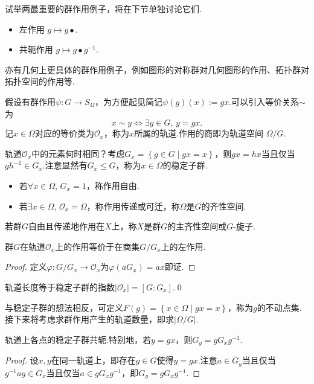 试举两最重要的群作用例子，将在下节单独讨论它们.
\begin{itemize}
	\item {\heiti 左作用} $g\mapsto g\bullet$.
	\item {\heiti 共轭作用} $g\mapsto g\bullet g^{-1}$.
\end{itemize}

亦有几何上更具体的群作用例子，例如图形的对称群对几何图形的作用、拓扑群对拓扑空间的作用等.

假设有群作用$\psi\colon G\to S_\Omega$，为方便起见简记$\psi(g)(x):=gx$.可以引入等价关系$\sim$为
\[
	x\sim y\iff\exists g\in G,\,y=gx.
\]
记$x\in\Omega$对应的等价类为$\mathcal{O}_x$，称为$x$所属的{\heiti 轨道}.作用的{\heiti 商}即为{\heiti 轨道空间} $\Omega/G$.

轨道$\mathcal{O}_x$中的元素何时相同？考虑$G_x=\left\{g\in G\mid gx=x\right\}$，则$gx=hx$当且仅当$gh^{-1}\in G_x$.注意显然有$G_x\le G$，称为$x\in\Omega$的{\heiti 稳定子群}.

\begin{itemize}
	\item 若$\forall x\in\Omega,\,G_x=1$，称作用{\heiti 自由}.
	\item 若$\exists x\in\Omega,\,\mathcal{O}_x=\Omega$，称作用{\heiti 传递}或{\heiti 可迁}，称$\Omega$是$G$的{\heiti 齐性空间}.
\end{itemize}
\begin{remark}
	若群$G$自由且传递地作用在$X$上，称$X$是群$G$的{\heiti 主齐性空间}或$G${\heiti -旋子}.
\end{remark}
\begin{prop}
	群$G$在轨道$\mathcal{O}_x$上的作用等价于在商集\footnotemark $G/G_x$上的左作用.\hypertarget{prop:GrpActionEquiv}{}
\end{prop}
\begin{proof}
	定义$\varphi\colon G/G_x\to \mathcal{O}_x$为$\varphi(aG_x)=ax$即证.
\end{proof}
\begin{cor*}
	轨道长度等于稳定子群的指数$|\mathcal{O}_x|=[G:G_x]$.\qed
\end{cor*}

与稳定子群的想法相反，可定义$F(g)=\left\{x\in\Omega\mid gx=x\right\}$，称为$g$的{\heiti 不动点集}.接下来将考虑求群作用产生的轨道数量，即求$|\Omega/G|$.
\begin{lemma*}
	轨道上各点的稳定子群共轭.特别地，若$y=gx$，则$G_y=gG_xg^{-1}$.
\end{lemma*}
\begin{proof}
	设$x,y$在同一轨道上，即存在$g\in G$使得$y=gx$.注意$a\in G_y$当且仅当$g^{-1}ag\in G_x$当且仅当$a\in gG_xg^{-1}$，即$G_y=gG_xg^{-1}$.
\end{proof}

